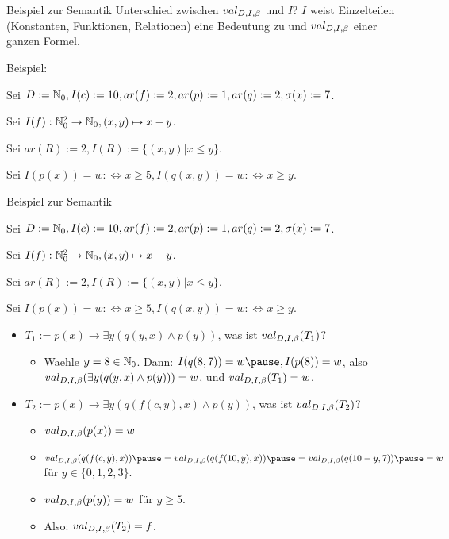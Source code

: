 \documentclass[]{beamer}
\begin{document}
\begin{frame}{Beispiel zur Semantik}
	Unterschied zwischen $val_{D,I,\beta}$ und $I$? \pause $I$ weist Einzelteilen (Konstanten, Funktionen, Relationen) eine Bedeutung zu und $val_{D,I,\beta}$ einer ganzen Formel.\pause\vertspace
	
	Beispiel:\vertspace\ip
	
	Sei $D := \mathbb{N}_0, I(c) := 10, ar(f) := 2, ar(p) := 1, ar(q) := 2, \sigma(x) := 7$.\ip
	
	Sei $I(f) : \mathbb{N}_0^2 \rightarrow \mathbb{N}_0, (x,y) \mapsto x-y$.\ip
	
	Sei $ar(R) := 2, I(R) := \{(x,y) | x \leq y\}$.\ip
	
	Sei $I(p(x)) = w :\Leftrightarrow x \geq 5, I(q(x,y)) = w :\Leftrightarrow x \geq y$.
\end{frame}

\begin{frame}{Beispiel zur Semantik}
	
	Sei $D := \mathbb{N}_0, I(c) := 10, ar(f) := 2, ar(p) := 1, ar(q) := 2, \sigma(x) := 7$.
	
	Sei $I(f) : \mathbb{N}_0^2 \rightarrow \mathbb{N}_0, (x,y) \mapsto x-y$.
	
	Sei $ar(R) := 2, I(R) := \{(x,y) | x \leq y\}$.
	
	Sei $I(p(x)) = w :\Leftrightarrow x \geq 5, I(q(x,y)) = w :\Leftrightarrow x \geq y$.
	
	\begin{itemize}
		\item $T_1 := p(x) \rightarrow \exists y (q(y,x) \land p(y))$, was ist $val_{D,I,\beta}(T_1)$?
		
		\pause
		\begin{itemize}
			\item Waehle $y = 8 \in \mathbb{N}_0$. \ip Dann: $I(q(8,7)) = w\ip, I(p(8)) = w$\ip, also $val_{D,I,\beta}(\exists y (q(y,x) \land p(y))) = w$\ip, und $val_{D,I,\beta}(T_1) = w$.
		\end{itemize}
		
		\pause
		
		\item $T_2 := p(x) \rightarrow \exists y (q(f(c,y), x) \land p(y))$, was ist $val_{D,I,\beta}(T_2)$?
		
		\pause
		\begin{itemize}
			\item $val_{D,I,\beta}(p(x)) = w$
			\ip\item $\pval(q(f(c,y), x)) \ip = \pval(q(f(10,y), x))\ip = \pval(q(10-y, 7))\ip = w$ für $y \in \{0,1,2,3\}$.
			\ip\item $val_{D,I,\beta}(p(y)) = w$ für $y \geq 5$.
			\ip\item Also: $val_{D,I,\beta}(T_2) = f$.
		\end{itemize}
	\end{itemize}
\end{frame}
\end{document}

